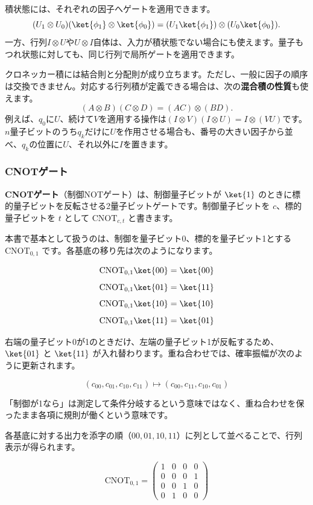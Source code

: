 積状態には、それぞれの因子へゲートを適用できます。
\[
(U_1\otimes U_0)(\ket{\phi_1}\otimes\ket{\phi_0})
=(U_1\ket{\phi_1})\otimes(U_0\ket{\phi_0}).
\]
一方、行列$I\otimes U$や$U\otimes I$自体は、入力が積状態でない場合にも使えます。量子もつれ状態に対しても、同じ行列で局所ゲートを適用できます。

クロネッカー積には結合則と分配則が成り立ちます。ただし、一般に因子の順序は交換できません。対応する行列積が定義できる場合は、次の\textbf{混合積の性質}も使えます。
\[
(A\otimes B)(C\otimes D)=(AC)\otimes(BD).
\]
例えば、$q_0$に$U$、続けて$V$を適用する操作は$(I\otimes V)(I\otimes U)=I\otimes(VU)$です。$n$量子ビットのうち$q_k$だけに$U$を作用させる場合も、番号の大きい因子から並べ、$q_k$の位置に$U$、それ以外に$I$を置きます。

\subsubsection{CNOTゲート}

\textbf{CNOTゲート}（制御NOTゲート）は、制御量子ビットが $\ket{1}$ のときに標的量子ビットを反転させる2量子ビットゲートです。制御量子ビットを $c$、標的量子ビットを $t$ として $\mathrm{CNOT}_{c,t}$ と書きます。

本書で基本として扱うのは、制御を量子ビット0、標的を量子ビット1とする $\mathrm{CNOT}_{0,1}$ です。各基底の移り先は次のようになります。

\[
\mathrm{CNOT}_{0,1} \ket{00} = \ket{00}
\]
\[
\mathrm{CNOT}_{0,1} \ket{01} = \ket{11}
\]
\[
\mathrm{CNOT}_{0,1} \ket{10} = \ket{10}
\]
\[
\mathrm{CNOT}_{0,1} \ket{11} = \ket{01}
\]

右端の量子ビット0が1のときだけ、左端の量子ビット1が反転するため、$\ket{01}$ と $\ket{11}$ が入れ替わります。重ね合わせでは、確率振幅が次のように更新されます。

\[
(c_{00}, c_{01}, c_{10}, c_{11}) \longmapsto (c_{00}, c_{11}, c_{10}, c_{01})
\]

「制御が1なら」は測定して条件分岐するという意味ではなく、重ね合わせを保ったまま各項に規則が働くという意味です。

各基底に対する出力を添字の順（$00, 01, 10, 11$）に列として並べることで、行列表示が得られます。

\[
\mathrm{CNOT}_{0,1} = \begin{pmatrix}
1 & 0 & 0 & 0 \\
0 & 0 & 0 & 1 \\
0 & 0 & 1 & 0 \\
0 & 1 & 0 & 0
\end{pmatrix}
\]

